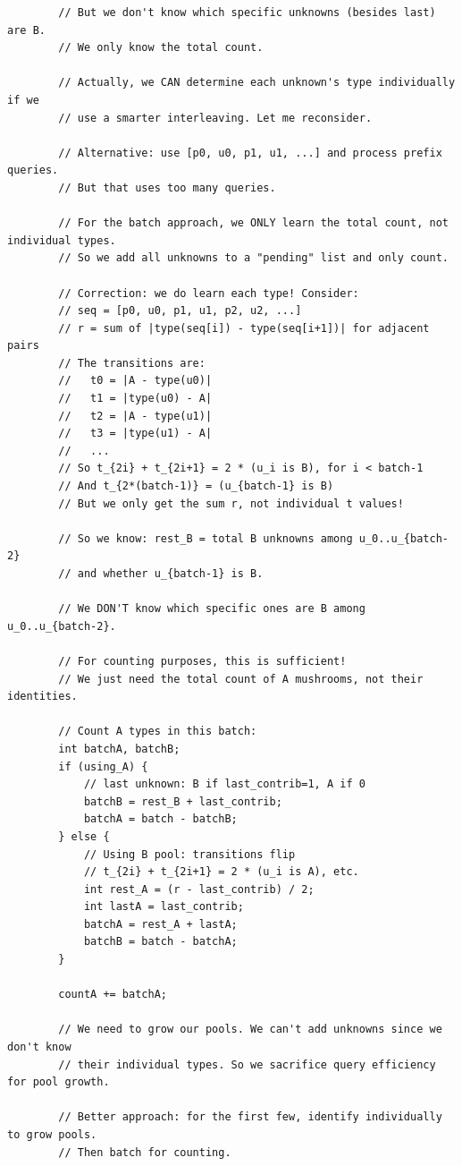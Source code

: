 \documentclass[11pt,a4paper]{article}
\begin{document}
\begin{lstlisting}
        // But we don't know which specific unknowns (besides last) are B.
        // We only know the total count.

        // Actually, we CAN determine each unknown's type individually if we
        // use a smarter interleaving. Let me reconsider.

        // Alternative: use [p0, u0, p1, u1, ...] and process prefix queries.
        // But that uses too many queries.

        // For the batch approach, we ONLY learn the total count, not individual types.
        // So we add all unknowns to a "pending" list and only count.

        // Correction: we do learn each type! Consider:
        // seq = [p0, u0, p1, u1, p2, u2, ...]
        // r = sum of |type(seq[i]) - type(seq[i+1])| for adjacent pairs
        // The transitions are:
        //   t0 = |A - type(u0)|
        //   t1 = |type(u0) - A|
        //   t2 = |A - type(u1)|
        //   t3 = |type(u1) - A|
        //   ...
        // So t_{2i} + t_{2i+1} = 2 * (u_i is B), for i < batch-1
        // And t_{2*(batch-1)} = (u_{batch-1} is B)
        // But we only get the sum r, not individual t values!

        // So we know: rest_B = total B unknowns among u_0..u_{batch-2}
        // and whether u_{batch-1} is B.

        // We DON'T know which specific ones are B among u_0..u_{batch-2}.

        // For counting purposes, this is sufficient!
        // We just need the total count of A mushrooms, not their identities.

        // Count A types in this batch:
        int batchA, batchB;
        if (using_A) {
            // last unknown: B if last_contrib=1, A if 0
            batchB = rest_B + last_contrib;
            batchA = batch - batchB;
        } else {
            // Using B pool: transitions flip
            // t_{2i} + t_{2i+1} = 2 * (u_i is A), etc.
            int rest_A = (r - last_contrib) / 2;
            int lastA = last_contrib;
            batchA = rest_A + lastA;
            batchB = batch - batchA;
        }

        countA += batchA;

        // We need to grow our pools. We can't add unknowns since we don't know
        // their individual types. So we sacrifice query efficiency for pool growth.

        // Better approach: for the first few, identify individually to grow pools.
        // Then batch for counting.


\end{lstlisting}
\end{document}
